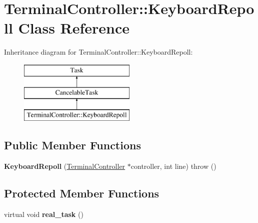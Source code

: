 \hypertarget{classTerminalController_1_1KeyboardRepoll}{
\section{TerminalController::KeyboardRepoll Class Reference}
\label{classTerminalController_1_1KeyboardRepoll}
}
Inheritance diagram for TerminalController::KeyboardRepoll:\begin{figure}[H]
\begin{center}
\leavevmode
\includegraphics[height=3cm]{classTerminalController_1_1KeyboardRepoll}
\end{center}
\end{figure}
\subsection*{Public Member Functions}
\begin{DoxyCompactItemize}
\item 
\hypertarget{classTerminalController_1_1KeyboardRepoll_aaa7d42fbcac1d6ebd40798a2881e2f82}{
{\bfseries KeyboardRepoll} (\hyperlink{classTerminalController}{TerminalController} $\ast$controller, int line)  throw ()}
\label{classTerminalController_1_1KeyboardRepoll_aaa7d42fbcac1d6ebd40798a2881e2f82}

\end{DoxyCompactItemize}
\subsection*{Protected Member Functions}
\begin{DoxyCompactItemize}
\item 
\hypertarget{classTerminalController_1_1KeyboardRepoll_a4446f19f4cfa20e4bbc307ae11f575b0}{
virtual void {\bfseries real\_\-task} ()}
\label{classTerminalController_1_1KeyboardRepoll_a4446f19f4cfa20e4bbc307ae11f575b0}

\end{DoxyCompactItemize}
